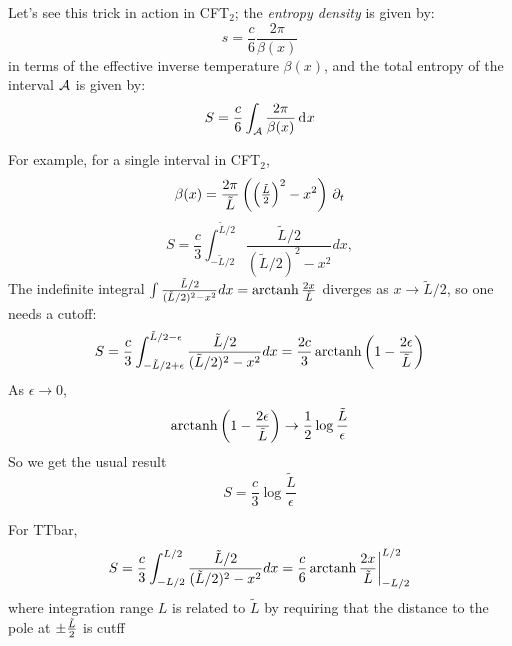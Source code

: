 \documentclass[11pt,a4paper,utf8]{article}
\begin{document}
	Let's see this trick in action in CFT$_2$; the \textit{entropy density} is given by:
	\begin{equation}
	s = \frac{c}{6} \frac{2\pi}{\beta(x)}
	\end{equation}
	in terms of the effective inverse temperature $\beta(x)$, and the total entropy of the interval $\mathcal{A}$ is given by:
	\begin{equation}
	S = \frac{c}{6}
		\int_{\mathcal{A}} \frac{2\pi}{\beta(x)} \mathinner{\mathrm{d}^{}x}
	\end{equation}
	
	For example, for a single interval in CFT$_2$,
	\begin{equation}
		\beta(x)
		= \frac{2\pi}{{\tilde L}}
			\left(
				\left(\tfrac{{\tilde L}}{2}\right)^2
				- x^2
			\right) \,\partial_{t}
	\end{equation}
	\begin{equation}
	S= \frac{c}{3} \int_{-{\tilde L}/2}^{{\tilde L}/2}
			\frac{{\tilde L}/2}{({\tilde L}/2)^2-x^2}dx,
	\end{equation}
	The indefinite integral $
		\int \frac{{\tilde L}/2}{({\tilde L}/2)^2-x^2}dx
		= \operatorname{arctanh}\frac{2x}{{\tilde L}}
	$ diverges as $x\rightarrow {\tilde L}/2$, so one needs a cutoff:
	\begin{equation}
	S=\frac{c}{3}\int_{-{\tilde L}/2+\epsilon}^{{\tilde L}/2-\epsilon}
		\frac{{\tilde L}/2}{({\tilde L}/2)^2-x^2}dx
	=\frac{2c}{3} \operatorname{arctanh} \left(
			1-\frac{2\epsilon}{{\tilde L}}
		\right)
	\end{equation}
	As $\epsilon\rightarrow 0$,
	\begin{equation}
		\operatorname{arctanh} \left(
			1-\frac{2\epsilon}{{\tilde L}}
		\right)\rightarrow \frac{1}{2}\log\frac{{\tilde L}}{\epsilon}
	\end{equation}
	So we get the usual result
	\begin{equation}
	S=\frac{c}{3}\log\frac{{\tilde L}}{\epsilon}
	\end{equation}
	
	{\color{red} For TTbar,  \begin{equation}
	S=\frac{c}{3}\int_{- L/2}^{L/2}
		\frac{{\tilde L}/2}{({\tilde L}/2)^2-x^2}dx
		={c\over6} \operatorname{arctanh} {2x\over {\tilde L}}\bigg|^{L/2}_{-{L/2}}
	\end{equation}   }
	where integration range $L$ is related to $\tilde L$ by requiring that the distance to the pole at $\pm{\tilde L\over 2}$ is cutff
	
	
	
\end{document}
